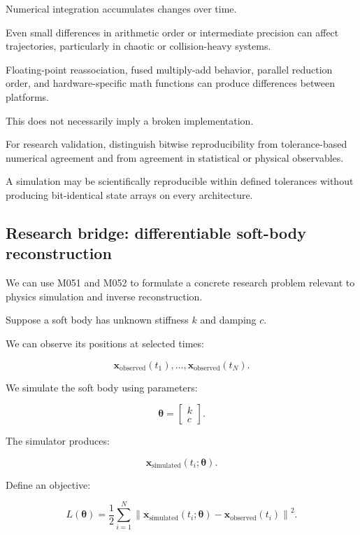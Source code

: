 Numerical integration accumulates changes over time.

Even small differences in arithmetic order or intermediate precision can affect trajectories, particularly in chaotic or collision-heavy systems.

Floating-point reassociation, fused multiply-add behavior, parallel reduction order, and hardware-specific math functions can produce differences between platforms.

This does not necessarily imply a broken implementation.

For research validation, distinguish bitwise reproducibility from tolerance-based numerical agreement and from agreement in statistical or physical observables.

A simulation may be scientifically reproducible within defined tolerances without producing bit-identical state arrays on every architecture.

\subsection{Research bridge: differentiable soft-body reconstruction}\label{02-foundations-ii-ch022-research-bridge-differentiable-soft-body-reconstruction}

\hypertarget{02-foundations-ii-ch022-research-bridge-differentiable-soft-body-reconstruction}{}

We can use M051 and M052 to formulate a concrete research problem relevant to physics simulation and inverse reconstruction.

Suppose a soft body has unknown stiffness \(k\) and damping \(c\).

We can observe its positions at selected times:

\[
\mathbf x_{\mathrm{observed}}(t_1),\ldots, \mathbf x_{\mathrm{observed}}(t_N).
\]

We simulate the soft body using parameters:

\[
\boldsymbol\theta= \begin{bmatrix} k\\c \end{bmatrix}.
\]

The simulator produces:

\[
\mathbf x_{\mathrm{simulated}}(t_i;\boldsymbol\theta).
\]

Define an objective:

\[
\boxed{ L(\boldsymbol\theta)= \frac12\sum_{i=1}^{N} \left\| \mathbf x_{\mathrm{simulated}}(t_i;\boldsymbol\theta) - \mathbf x_{\mathrm{observed}}(t_i) \right\|^2 }.
\]

